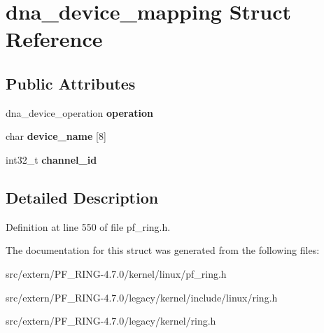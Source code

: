 \hypertarget{structdna__device__mapping}{
\section{dna\_\-device\_\-mapping Struct Reference}
\label{structdna__device__mapping}
}
\subsection*{Public Attributes}
\begin{DoxyCompactItemize}
\item 
\hypertarget{structdna__device__mapping_aaa1fba2b904bdc3c4ae9a68ac014f390}{
dna\_\-device\_\-operation {\bfseries operation}}
\label{structdna__device__mapping_aaa1fba2b904bdc3c4ae9a68ac014f390}

\item 
\hypertarget{structdna__device__mapping_a6fb44c547726c99d6fc24277c9e7d232}{
char {\bfseries device\_\-name} \mbox{[}8\mbox{]}}
\label{structdna__device__mapping_a6fb44c547726c99d6fc24277c9e7d232}

\item 
\hypertarget{structdna__device__mapping_abc154880c9ee2e843c0010df5a47b8b6}{
int32\_\-t {\bfseries channel\_\-id}}
\label{structdna__device__mapping_abc154880c9ee2e843c0010df5a47b8b6}

\end{DoxyCompactItemize}


\subsection{Detailed Description}


Definition at line 550 of file pf\_\-ring.h.



The documentation for this struct was generated from the following files:\begin{DoxyCompactItemize}
\item 
src/extern/PF\_\-RING-\/4.7.0/kernel/linux/pf\_\-ring.h\item 
src/extern/PF\_\-RING-\/4.7.0/legacy/kernel/include/linux/ring.h\item 
src/extern/PF\_\-RING-\/4.7.0/legacy/kernel/ring.h\end{DoxyCompactItemize}
